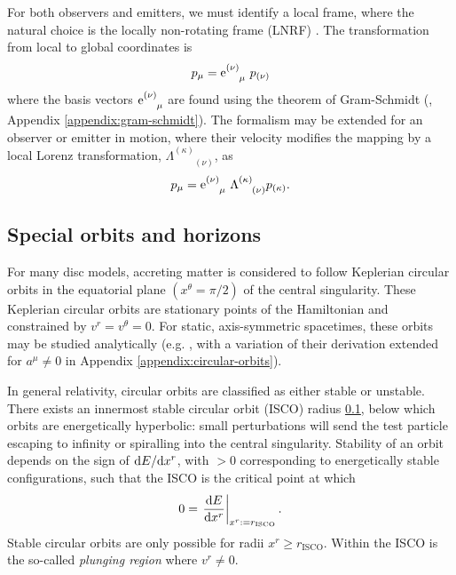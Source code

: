For both observers and emitters, we must identify a local frame, where the natural choice is the locally non-rotating frame (LNRF) \citep{bardeen_rotating_1972} . The transformation from local to global coordinates is
\begin{equation}
    p_\mu = \text{e}^{(\nu)}_{\phantom{(\nu)}\mu}\  p_{(\nu)}
\end{equation}
where the basis vectors $\text{e}^{(\nu)}_{\phantom{(\nu)}\mu}$ are found using the theorem of Gram-Schmidt (\cite{schmidt_uber_1989}, Appendix \ref{appendix:gram-schmidt}). The formalism may be extended for an observer or emitter in motion, where their velocity modifies the mapping by a local Lorenz transformation, $\Lambda^{(\kappa)}_{\phantom{(\kappa)}(\nu)}$, as 
\begin{equation}
    p_\mu = \text{e}^{(\nu)}_{\phantom{(\nu)}\mu}\  \Lambda^{(\kappa)}_{\phantom{(a)}(\nu)} p_{(\kappa)}.
\end{equation}

\subsection{Special orbits and horizons}

For many disc models, accreting matter is considered to follow Keplerian circular orbits in the equatorial plane $(x^\theta = \pi/2)$ of the central singularity. These Keplerian circular orbits are stationary points of the Hamiltonian and constrained by $v^r = v^\theta = 0$. For static, axis-symmetric spacetimes, these orbits may be studied analytically (e.g. \cite{johannsen_regular_2013}, with a variation of their derivation extended for $a^\mu \neq 0$ in Appendix \ref{appendix:circular-orbits}).

In general relativity, circular orbits are classified as either stable or unstable. There exists an innermost stable circular orbit (ISCO) radius \ref{}, below which orbits are energetically hyperbolic: small perturbations will send the test particle escaping to infinity or spiralling into the central singularity.  Stability of an orbit depends on the sign of $\text{d} E / \text{d} x^r$, with $>0$ corresponding to energetically stable configurations, such that the ISCO is the critical point at which 
\begin{equation}
    \label{eq:isco-definition}
    0 = \left. \frac{\text{d} E}{\text{d} x^r} \right\rvert_{x^r := r_\text{ISCO}}.
\end{equation}
Stable circular orbits are only possible for radii $x^r \geq r_\text{ISCO}$. Within the ISCO is the so-called \textit{plunging region} where $v^r \neq 0$. 


